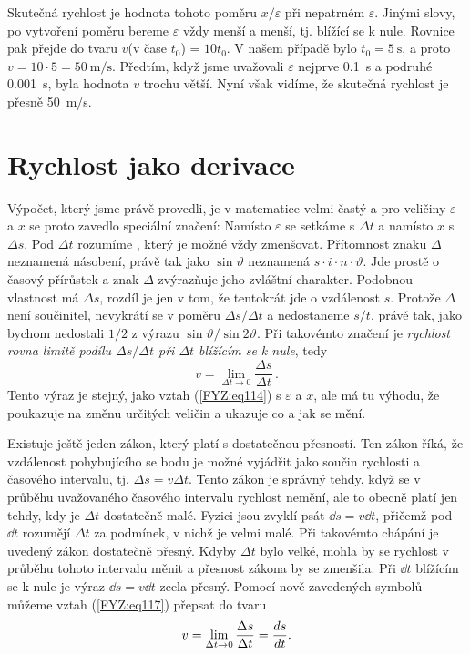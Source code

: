     Skutečná rychlost je hodnota tohoto poměru \(x/\varepsilon\) při nepatrném \(\varepsilon\). 
    Jinými slovy, po vytvoření poměru bereme \(\varepsilon\) vždy menší a menší, tj. blížící se k 
    nule. Rovnice pak přejde do tvaru \(v\)(v čase \(t_0\)) = \(10t_0\). V našem případě bylo \(t_0 
    = \SI{5}{\s}\), a proto \(v = 10\cdot5 = \SI{50}{\m/\s}\). Předtím, když jsme uvažovali 
    \(\varepsilon\) nejprve \SI{0.1}{\s} a podruhé \SI{0.001}{\s}, byla hodnota \(v\) trochu větší. 
    Nyní však vidíme, že skutečná rychlost je přesně \SI{50}{\m/\s}.
    
  \section{Rychlost jako derivace}
    Výpočet, který jsme právě provedli, je v matematice velmi častý a pro veličiny \(\varepsilon\) 
    a \(x\) se proto zavedlo speciální značení: Namísto \(\varepsilon\) se setkáme s \(\Delta t\) a 
    namísto \(x\) s \(\Delta s\). Pod \(\Delta t\) rozumíme , který je 
    možné vždy zmenšovat. Přítomnost znaku \(\Delta\) neznamená násobení, právě tak jako 
    \(\sin\vartheta\) neznamená \(s\cdot i \cdot n \cdot \vartheta\). Jde prostě o časový přírůstek 
    a znak \(\Delta\) zvýrazňuje jeho zvláštní charakter. Podobnou vlastnost má \(\Delta s\), 
    rozdíl je jen v tom, že tentokrát jde o vzdálenost \(s\). Protože \(\Delta\) není součinitel, 
    nevykrátí se v poměru \(\Delta s/\Delta t\) a nedostaneme \(s/t\), právě tak, jako bychom 
    nedostali \(1/2\) z výrazu \(\sin \vartheta/\sin2\vartheta\). Při takovémto značení je 
    \emph{rychlost rovna limitě podílu \(\Delta s/\Delta t\) při \(\Delta t\) blížícím se k nule}, 
    tedy
    \begin{equation}\label{FYZ:eq117}
      \boxed{v = \lim_{\Delta t\to 0}{\frac{\Delta s}{\Delta t}}}\,.
    \end{equation}
    Tento výraz je stejný, jako vztah (\ref{FYZ:eq114}) s \(\varepsilon\) a \(x\), ale má tu 
    výhodu, že poukazuje na změnu určitých veličin a ukazuje co a jak se mění.
    
    Existuje ještě jeden zákon, který platí s dostatečnou přesností. Ten zákon říká, že vzdálenost 
    pohybujícího se bodu je možné vyjádřit jako součin rychlosti a časového intervalu, tj. \(\Delta 
    s = v\Delta t\). Tento zákon je správný tehdy, když se v průběhu uvažovaného časového intervalu 
    rychlost nemění, ale to obecně platí jen tehdy, kdy je \(\Delta t\) dostatečně malé. Fyzici 
    jsou zvyklí psát \(\dd{s} = v\dd{t}\), přičemž pod \(\dd{t}\) rozumějí \(\Delta t\) za 
    podmínek, v nichž je velmi malé. Při takovémto chápání je uvedený zákon dostatečně přesný. 
    Kdyby \(\Delta t\) bylo velké, mohla by se rychlost v průběhu tohoto intervalu měnit a přesnost 
    zákona by se zmenšila. Při \(\dd{t}\) blížícím se k nule je výraz \(\dd{s} = v\dd{t}\) zcela 
    přesný. Pomocí nově zavedených symbolů můžeme vztah (\ref{FYZ:eq117}) přepsat do tvaru
    \begin{equation}\label{FYZ:eq118}
      v = \lim_{\Delta t\to 0}{\frac{\Delta s}{\Delta t}} = \dfrac{d s}{d t}.
    \end{equation}
    
